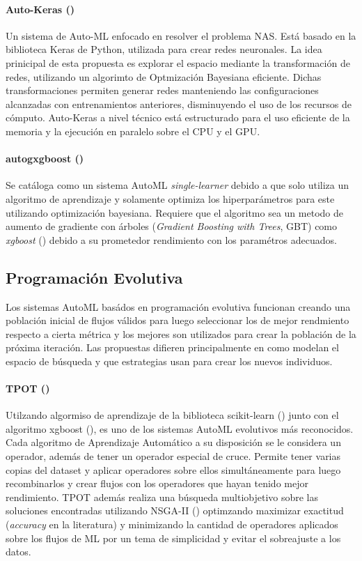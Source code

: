       \paragraph*{Auto-Keras (\cite{jin2018efficient})} Un sistema de Auto-ML enfocado en resolver el problema NAS. Est\'a basado en la biblioteca Keras de Python, utilizada para crear redes neuronales.  La idea prinicipal de esta propuesta es explorar el espacio mediante la transformaci\'on de redes, utilizando un algorimto de Optmizaci\'on Bayesiana eficiente. Dichas transformaciones permiten generar redes manteniendo las configuraciones alcanzadas con entrenamientos anteriores, disminuyendo el uso de los recursos de c\'omputo. Auto-Keras a nivel t\'ecnico est\'a estructurado para el uso eficiente de la memoria y la ejecuci\'on en paralelo sobre el CPU y el GPU.

      \paragraph*{autogxgboost (\cite{thomas2018automatic})} Se cat\'aloga como un sistema AutoML \textit {single-learner} debido a que solo utiliza un algoritmo de aprendizaje y solamente optimiza los hiperpar\'ametros para este utilizando optimizaci\'on bayesiana. Requiere que el algoritmo sea un metodo de aumento de gradiente con \'arboles (\textit{Gradient Boosting with Trees}, GBT) como \textit {xgboost} (\cite{chen2016xgboost}) debido a su prometedor rendimiento con los param\'etros adecuados.   
    
\subsection{Programaci\'on Evolutiva}
     Los sistemas AutoML bas\'ados en programaci\'on evolutiva funcionan creando una poblaci\'on inicial de flujos v\'alidos para luego seleccionar los de mejor rendmiento respecto a cierta m\'etrica y los mejores son utilizados para crear la poblaci\'on de la pr\'oxima iteraci\'on. Las propuestas difieren principalmente en como modelan el espacio de b\'usqueda y que estrategias usan para crear los nuevos individuos.
     \paragraph*{TPOT (\cite{pmlr-v64-olson_tpot_2016})} Utilzando algormiso de aprendizaje de la biblioteca scikit-learn (\cite{pedregosa2011scikit}) junto con el algoritmo xgboost (\cite{chen2016xgboost}), es uno de los sistemas AutoML evolutivos m\'as reconocidos. Cada algoritmo de Aprendizaje Autom\'atico a su disposici\'on se le considera un operador, adem\'as de tener un operador especial de cruce. Permite tener varias copias del dataset y aplicar operadores sobre ellos simult\'aneamente para luego recombinarlos y crear flujos con los operadores que hayan tenido mejor rendimiento. TPOT adem\'as realiza una b\'usqueda multiobjetivo sobre las soluciones encontradas utilizando NSGA-II (\cite{deb2002fast}) optimzando maximizar exactitud (\textit{accuracy} en la literatura) y minimizando la cantidad de operadores aplicados sobre los flujos de ML por un tema de simplicidad y evitar el sobreajuste a los datos.

